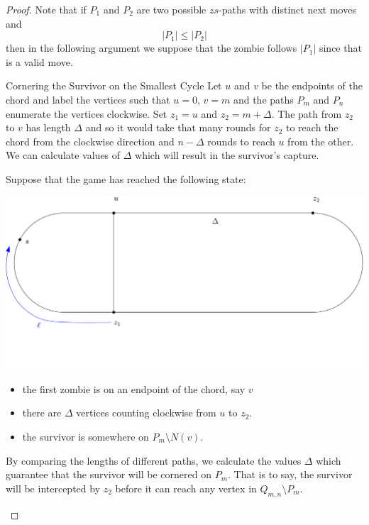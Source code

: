 \begin{proof}
 Note that if $P_1$ and $P_2$ are two possible $zs$-paths with distinct next moves and
 \[ |P_1| \leq |P_2| \]
 then in the following argument we suppose that the zombie follows $|P_1|$
 since that is a valid move.

 \newpage

 \begin{proofpart} Cornering the Survivor on the Smallest Cycle
   Let $u$ and $v$ be the endpoints of the chord and label the vertices
   such that $u=0$, $v=m$ and the paths $P_m$ and $P_n$ enumerate the vertices clockwise.
   Set $z_1 = u$ and $z_2 = m+\Delta$. The path from $z_2$ to $v$
   has length $\Delta$ and so it would take that many rounds for $z_2$ to reach the
   chord from the clockwise direction and $n-\Delta$ rounds to reach $u$ from the other.
   We can calculate values of $\Delta$ which will result in the survivor's capture.

  Suppose that the game has reached the following state:

  \begin{center}
    \includegraphics[scale=0.20]{q_m_n/diagram1}
  \end{center}

  \begin{itemize}
   \item the first zombie is on an endpoint of the chord, say $v$
   \item there are $\Delta$ vertices counting clockwise from $u$ to $z_2$.
   \item the survivor is somewhere on $P_m \setminus N(v)$.
  \end{itemize}

  By comparing the lengths of different paths, we calculate the values $\Delta$
  which guarantee that the survivor will be cornered on $P_m$. That is to say,
  the survivor will be intercepted by $z_2$ before it can reach any vertex
  in $Q_{m,n} \setminus P_m$.


\end{proofpart}
\end{proof}
